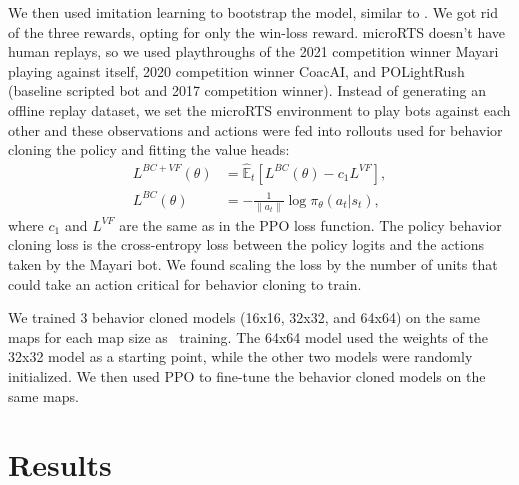 \documentclass{article}
\begin{document}
We then used imitation learning to bootstrap the model, similar to
\cite{Vinyals2019GrandmasterLI}. We got rid of the three rewards, opting for only the
win-loss reward. microRTS doesn't have human replays, so we used playthroughs of the
2021 competition winner Mayari playing against itself, 2020 competition winner CoacAI, 
and POLightRush (baseline scripted bot and 2017 competition winner). Instead of
generating an offline replay dataset, we set the microRTS environment to play bots
against each other and these observations and actions were fed into rollouts used for
behavior cloning the policy and fitting the value heads:
\begin{align}
    L^{BC+VF}(\theta) &= \hat{\mathbb{E}}_t \left[ L^{BC}(\theta) - c_1 L^{VF} \right], \\
    L^{BC}(\theta) &= -\frac{1}{\|a_t\|} \log \pi_{\theta}(a_t|s_t),
\end{align}
where $c_1$ and $L^{VF}$ are the same as in the PPO loss function. The policy behavior
cloning loss is the cross-entropy loss between the policy logits and the actions taken
by the Mayari bot. We found scaling the loss by the number of units that could take an
action critical for behavior cloning to train.

We trained 3 behavior cloned models (16x16, 32x32, and 64x64) on the same maps for each
map size as \agentName\ training. The 64x64 model used the weights of the 32x32 model 
as a starting point, while the other two models were randomly initialized. We then used 
PPO to fine-tune the behavior cloned models on the same maps.

\section{Results}
\end{document}
